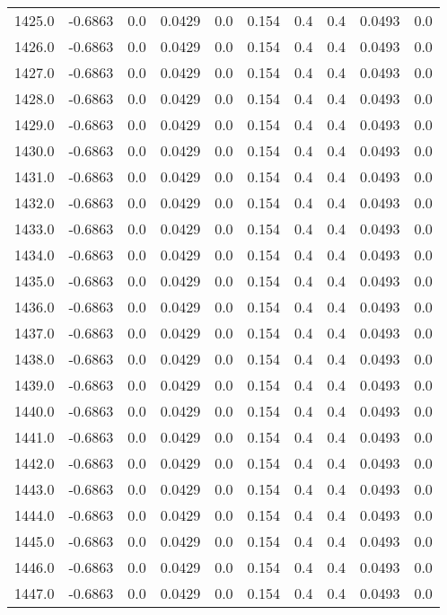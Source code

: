 \begin{longtable}{lrrrrrrrrr}
1425.0 & -0.6863 & 0.0 & 0.0429 & 0.0 & 0.154 & 0.4 & 0.4 & 0.0493 & 0.0 \\
1426.0 & -0.6863 & 0.0 & 0.0429 & 0.0 & 0.154 & 0.4 & 0.4 & 0.0493 & 0.0 \\
1427.0 & -0.6863 & 0.0 & 0.0429 & 0.0 & 0.154 & 0.4 & 0.4 & 0.0493 & 0.0 \\
1428.0 & -0.6863 & 0.0 & 0.0429 & 0.0 & 0.154 & 0.4 & 0.4 & 0.0493 & 0.0 \\
1429.0 & -0.6863 & 0.0 & 0.0429 & 0.0 & 0.154 & 0.4 & 0.4 & 0.0493 & 0.0 \\
1430.0 & -0.6863 & 0.0 & 0.0429 & 0.0 & 0.154 & 0.4 & 0.4 & 0.0493 & 0.0 \\
1431.0 & -0.6863 & 0.0 & 0.0429 & 0.0 & 0.154 & 0.4 & 0.4 & 0.0493 & 0.0 \\
1432.0 & -0.6863 & 0.0 & 0.0429 & 0.0 & 0.154 & 0.4 & 0.4 & 0.0493 & 0.0 \\
1433.0 & -0.6863 & 0.0 & 0.0429 & 0.0 & 0.154 & 0.4 & 0.4 & 0.0493 & 0.0 \\
1434.0 & -0.6863 & 0.0 & 0.0429 & 0.0 & 0.154 & 0.4 & 0.4 & 0.0493 & 0.0 \\
1435.0 & -0.6863 & 0.0 & 0.0429 & 0.0 & 0.154 & 0.4 & 0.4 & 0.0493 & 0.0 \\
1436.0 & -0.6863 & 0.0 & 0.0429 & 0.0 & 0.154 & 0.4 & 0.4 & 0.0493 & 0.0 \\
1437.0 & -0.6863 & 0.0 & 0.0429 & 0.0 & 0.154 & 0.4 & 0.4 & 0.0493 & 0.0 \\
1438.0 & -0.6863 & 0.0 & 0.0429 & 0.0 & 0.154 & 0.4 & 0.4 & 0.0493 & 0.0 \\
1439.0 & -0.6863 & 0.0 & 0.0429 & 0.0 & 0.154 & 0.4 & 0.4 & 0.0493 & 0.0 \\
1440.0 & -0.6863 & 0.0 & 0.0429 & 0.0 & 0.154 & 0.4 & 0.4 & 0.0493 & 0.0 \\
1441.0 & -0.6863 & 0.0 & 0.0429 & 0.0 & 0.154 & 0.4 & 0.4 & 0.0493 & 0.0 \\
1442.0 & -0.6863 & 0.0 & 0.0429 & 0.0 & 0.154 & 0.4 & 0.4 & 0.0493 & 0.0 \\
1443.0 & -0.6863 & 0.0 & 0.0429 & 0.0 & 0.154 & 0.4 & 0.4 & 0.0493 & 0.0 \\
1444.0 & -0.6863 & 0.0 & 0.0429 & 0.0 & 0.154 & 0.4 & 0.4 & 0.0493 & 0.0 \\
1445.0 & -0.6863 & 0.0 & 0.0429 & 0.0 & 0.154 & 0.4 & 0.4 & 0.0493 & 0.0 \\
1446.0 & -0.6863 & 0.0 & 0.0429 & 0.0 & 0.154 & 0.4 & 0.4 & 0.0493 & 0.0 \\
1447.0 & -0.6863 & 0.0 & 0.0429 & 0.0 & 0.154 & 0.4 & 0.4 & 0.0493 & 0.0 \\

\end{longtable}
